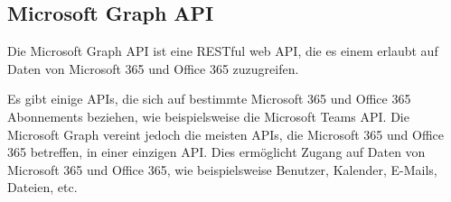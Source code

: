 \subsection{Microsoft Graph API}\label{subsec:microsoft-graph-api}
Die Microsoft Graph API ist eine \gls{RESTful} web API, die es einem erlaubt auf Daten von Microsoft 365 und Office 365 zuzugreifen.

Es gibt einige APIs, die sich auf bestimmte Microsoft 365 und Office 365 Abonnements beziehen, wie beispielsweise die Microsoft Teams API\@.
Die Microsoft Graph vereint jedoch die meisten APIs, die Microsoft 365 und Office 365 betreffen, in einer einzigen API\@.
Dies ermöglicht Zugang auf Daten von Microsoft 365 und Office 365, wie beispielsweise Benutzer, Kalender, E-Mails, Dateien, etc.



